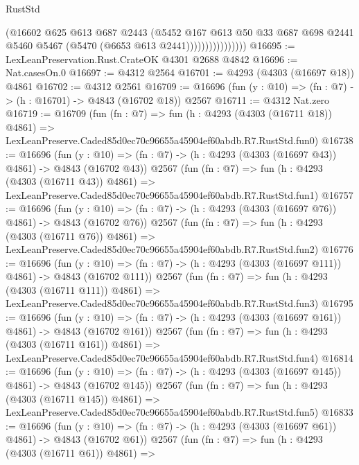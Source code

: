 \begin{lexlean}{RustStd}
\begin{coremodule}
                            (@16602
                              @625
                              @613
                              @687
                              @2443
                              (@5452
                                @167
                                @613
                                @50
                                @33
                                @687
                                @698
                                @2441
                                @5460
                                @5467
                                (@5470 (@6653 @613 @2441))))))))))))))))
@16695 := LexLeanPreservation.Rust.CrateOK @4301 @2688 @4842
@16696 := Nat.casesOn.{0}
@16697 := @4312 @2564
@16701 := @4293 (@4303 (@16697 @18)) @4861
@16702 := @4312 @2561
@16709 := @16696 (fun (y : @10) => (fn : @7) -> (h : @16701) -> @4843 (@16702 @18)) @2567
@16711 := @4312 Nat.zero
@16719 := @16709
    (fun (fn : @7) =>
    fun (h : @4293 (@4303 (@16711 @18)) @4861) =>
    LexLeanPreserve.Caded85d0ec70c96655a45904ef60abdb.R7.RustStd.fun0)
@16738 := @16696
    (fun (y : @10) => (fn : @7) -> (h : @4293 (@4303 (@16697 @43)) @4861) -> @4843 (@16702 @43))
    @2567
    (fun (fn : @7) =>
    fun (h : @4293 (@4303 (@16711 @43)) @4861) =>
    LexLeanPreserve.Caded85d0ec70c96655a45904ef60abdb.R7.RustStd.fun1)
@16757 := @16696
    (fun (y : @10) => (fn : @7) -> (h : @4293 (@4303 (@16697 @76)) @4861) -> @4843 (@16702 @76))
    @2567
    (fun (fn : @7) =>
    fun (h : @4293 (@4303 (@16711 @76)) @4861) =>
    LexLeanPreserve.Caded85d0ec70c96655a45904ef60abdb.R7.RustStd.fun2)
@16776 := @16696
    (fun (y : @10) => (fn : @7) -> (h : @4293 (@4303 (@16697 @111)) @4861) -> @4843 (@16702 @111))
    @2567
    (fun (fn : @7) =>
    fun (h : @4293 (@4303 (@16711 @111)) @4861) =>
    LexLeanPreserve.Caded85d0ec70c96655a45904ef60abdb.R7.RustStd.fun3)
@16795 := @16696
    (fun (y : @10) => (fn : @7) -> (h : @4293 (@4303 (@16697 @161)) @4861) -> @4843 (@16702 @161))
    @2567
    (fun (fn : @7) =>
    fun (h : @4293 (@4303 (@16711 @161)) @4861) =>
    LexLeanPreserve.Caded85d0ec70c96655a45904ef60abdb.R7.RustStd.fun4)
@16814 := @16696
    (fun (y : @10) => (fn : @7) -> (h : @4293 (@4303 (@16697 @145)) @4861) -> @4843 (@16702 @145))
    @2567
    (fun (fn : @7) =>
    fun (h : @4293 (@4303 (@16711 @145)) @4861) =>
    LexLeanPreserve.Caded85d0ec70c96655a45904ef60abdb.R7.RustStd.fun5)
@16833 := @16696
    (fun (y : @10) => (fn : @7) -> (h : @4293 (@4303 (@16697 @61)) @4861) -> @4843 (@16702 @61))
    @2567
    (fun (fn : @7) =>
    fun (h : @4293 (@4303 (@16711 @61)) @4861) =>

\end{coremodule}
\end{lexlean}
